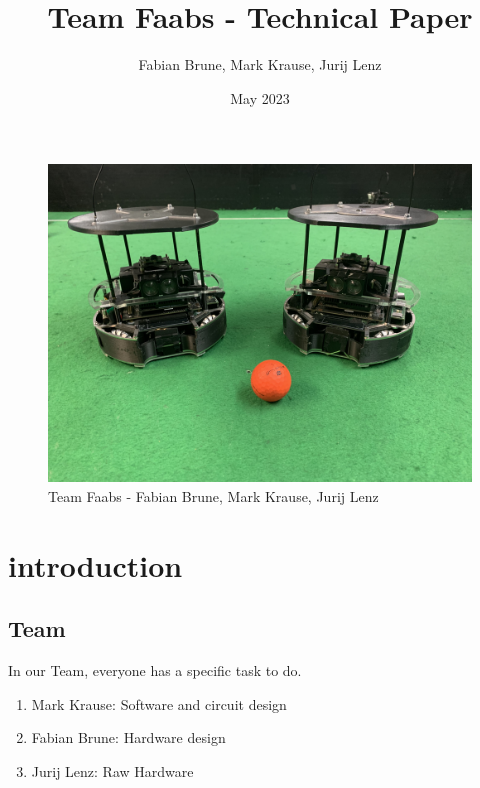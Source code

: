 \documentclass{scrartcl}
\title{Team Faabs - Technical Paper}
\author{Fabian Brune, Mark Krause, Jurij Lenz}
\date{May 2023}
\begin{document}
\maketitle


\begin{figure}[h]
    \centering
    \includegraphics[width=\textwidth]{img/Roboter mit Ball querformat 2.jpg}
    \caption{Team Faabs - Fabian Brune, Mark Krause, Jurij Lenz}
    \label{fig:team}
\end{figure}


\newpage


\tableofcontents
\newpage


\section{introduction}
\subsection{Team}


In our Team, everyone has a specific task to do.
\begin{enumerate}
    \item{Mark Krause: Software and circuit design }
    \item{Fabian Brune: Hardware design }
    \item{Jurij Lenz: Raw Hardware }
\end{enumerate}
\end{document}
